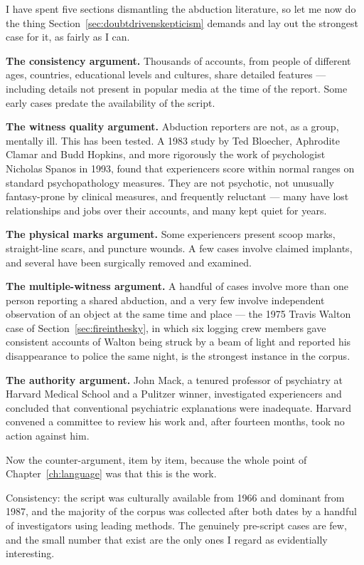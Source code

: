 I have spent five sections dismantling the abduction literature, so let me now do the thing
Section~\ref{sec:doubtdrivenskepticism} demands and lay out the strongest case for it, as fairly as I can.

\textbf{The consistency argument.} Thousands of accounts, from people of different ages,
countries, educational levels and cultures, share detailed features --- including details not
present in popular media at the time of the report. Some early cases predate the availability
of the script.

\textbf{The witness quality argument.} Abduction reporters are not, as a group, mentally ill.
This has been tested. A 1983 study by Ted Bloecher, Aphrodite Clamar and Budd Hopkins,
and more rigorously the work of psychologist Nicholas Spanos in 1993, found that experiencers
score within normal ranges on standard psychopathology measures. They are not psychotic, not
unusually fantasy-prone by clinical measures, and frequently reluctant --- many have lost
relationships and jobs over their accounts, and many kept quiet for years.

\textbf{The physical marks argument.} Some experiencers present scoop marks, straight-line
scars, and puncture wounds. A few cases involve claimed implants, and several have been
surgically removed and examined.

\textbf{The multiple-witness argument.} A handful of cases involve more than one person
reporting a shared abduction, and a very few involve independent observation of an object at
the same time and place --- the 1975 Travis Walton case of Section~\ref{sec:fireinthesky}, in which six logging crew members gave
consistent accounts of Walton being struck by a beam of light and reported his disappearance
to police the same night, is the strongest instance in the corpus.

\textbf{The authority argument.} John Mack, a tenured professor of psychiatry at Harvard Medical
School and a Pulitzer winner, investigated experiencers and concluded that conventional
psychiatric explanations were inadequate. Harvard convened a committee to review his work and,
after fourteen months, took no action against him.

Now the counter-argument, item by item, because the whole point of Chapter~\ref{ch:language} was that this is
the work.

Consistency: the script was culturally available from 1966 and dominant from 1987, and the
majority of the corpus was collected after both dates by a handful of investigators using
leading methods. The genuinely pre-script cases are few, and the small number that exist are
the only ones I regard as evidentially interesting.

